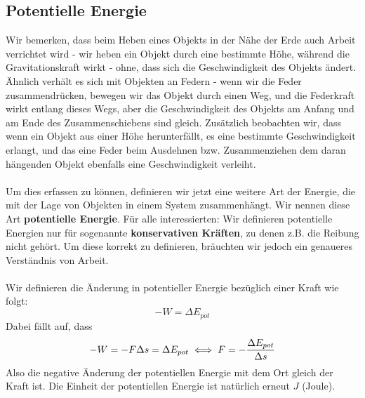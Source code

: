 \documentclass[11pt]{article}
\begin{document}
\subsection{Potentielle Energie}
Wir bemerken, dass beim Heben eines Objekts in der Nähe der Erde auch Arbeit verrichtet wird - wir heben ein Objekt durch eine bestimmte Höhe, während die Gravitationskraft wirkt - ohne, dass sich die Geschwindigkeit des Objekts ändert. Ähnlich verhält es sich mit Objekten an Federn - wenn wir die Feder zusammendrücken, bewegen wir das Objekt durch einen Weg, und die Federkraft wirkt entlang dieses Wegs, aber die Geschwindigkeit des Objekts am Anfang und am Ende des Zusammenschiebens sind gleich. Zusätzlich beobachten wir, dass wenn ein Objekt aus einer Höhe herunterfällt, es eine bestimmte Geschwindigkeit erlangt, und das eine Feder beim Ausdehnen bzw. Zusammenziehen dem daran hängenden Objekt ebenfalls eine Geschwindigkeit verleiht. \\\\ 
Um dies erfassen zu können, definieren wir jetzt eine weitere Art der Energie, die mit der Lage von Objekten in einem System zusammenhängt. Wir nennen diese Art \textbf{potentielle Energie}. Für alle interessierten: Wir definieren potentielle Energien nur für sogenannte \textbf{konservativen Kräften}, zu denen z.B. die Reibung nicht gehört. Um diese korrekt zu definieren, bräuchten wir jedoch ein genaueres Verständnis von Arbeit. \\\\
Wir definieren die Änderung in potentieller Energie bezüglich einer Kraft wie folgt: 
\begin{equation*}
    -W = \Delta E_{pot}
\end{equation*}
Dabei fällt auf, dass 
\begin{equation*}
    -W = -F\Delta s = \Delta E_{pot} \\
    \iff F = - \frac{\Delta E_{pot}}{\Delta s}
\end{equation*}
Also die negative Änderung der potentiellen Energie mit dem Ort gleich der Kraft ist. Die Einheit der potentiellen Energie ist natürlich erneut $J$ (Joule).
\end{document}
